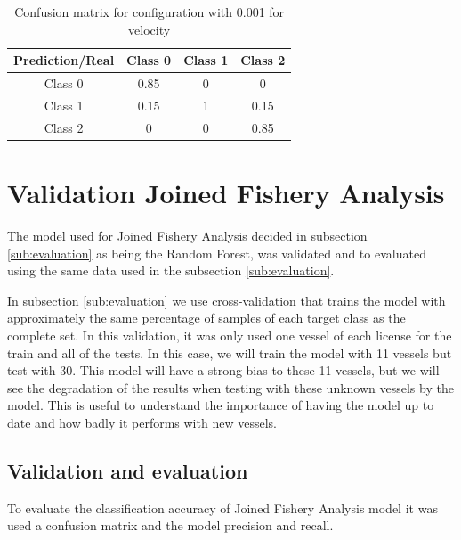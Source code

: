 
\begin {table}[H]
\caption {Confusion matrix for configuration with 0.001 for velocity}
\begin{center}
\begin{tabular}{c|c|c|c}
Prediction/Real & \textbf{Class 0} & \textbf{Class 1} & \textbf{Class 2} \\\hline
Class 0 & 0.85 & 0 & 0 \\
Class 1 & 0.15 & 1 & 0.15 \\
Class 2 & 0 & 0 & 0.85 
\label{table:val_sfa_cm}
\end{tabular}
\end{center}
\end {table}



\section{Validation Joined Fishery Analysis} %
\label{sub:val_JFA}

The model used for Joined Fishery Analysis decided in subsection \ref{sub:evaluation} as being the Random Forest, was validated and to evaluated using the same data used in the subsection \ref{sub:evaluation}.

In subsection \ref{sub:evaluation} we use cross-validation \cite{CrossValidatory} that trains the model with approximately the same percentage of samples of each target class as the complete set.
In this validation, it was only used one vessel of each license for the train and all of the tests. In this case, we will train the model with 11 vessels but test with 30. This model will have a strong bias to these 11 vessels, but we will see the degradation of the results when testing with these unknown vessels by the model.
This is useful to understand the importance of having the model up to date and how badly it performs with new vessels. 


\subsection{Validation and evaluation}
\label{sec:val_JFA_val_eva}
To evaluate the classification accuracy of Joined Fishery Analysis model it was used a confusion matrix and the model precision and recall.

